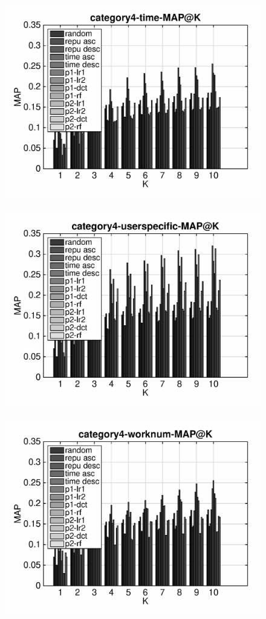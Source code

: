 \documentclass{article}
\begin{document}
\begin{figure}[ht]
\begin{flushleft}
\includegraphics[width=18cm,height=9cm]{category4-time-MAP@K.eps}
\includegraphics[width=18cm,height=9cm]{category4-userspecific-MAP@K.eps}
\includegraphics[width=18cm,height=9cm]{category4-worknum-MAP@K.eps}
\end{flushleft}
\end{figure}
\end{document}
